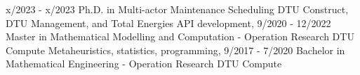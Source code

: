 \documentclass[9pt]{developercv} %
\begin{document}
\vspace{-10 pt}
\begin{entrylist}
	\entry
		{x/2023 - x/2023}
		{Ph.D. in Multi-actor Maintenance Scheduling}
		{DTU Construct, DTU Management, and Total Energies}
		{
			API development, 
		}
    \entry
		{9/2020 - 12/2022}
		{Master in Mathematical Modelling and Computation - Operation Research }
		{DTU Compute}
		{
			Metaheuristics, statistics, programming, 
		}
    \entry
		{9/2017 - 7/2020}
		{Bachelor in Mathematical Engineering - Operation Research}
		{DTU Compute}
		{
			
		}
\end{entrylist}
\end{document}
